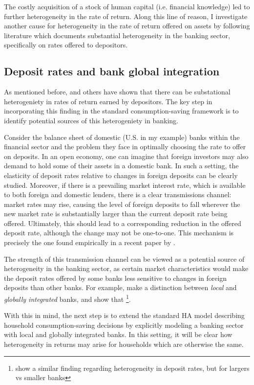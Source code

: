 \par The costly acquisition of a stock of human capital (i.e. financial knowledge) led to further heterogeneity in the rate of return. Along this line of reason, I investigate another cause for heterogeneity in the rate of return offered on assets by following literature which documents substantial heterogeneity in the banking sector, specifically on rates offered to depositors.

\subsection{Deposit rates and bank global integration}

\par As mentioned before, \cite{Deuflhard2018} and others have shown that there can be substational heterogeniety in rates of return earned by depositors. The key step in incorporating this finding in the standard consumption-saving framework is to identify potential sources of this heterogeniety in banking.

\par Consider the balance sheet of domestic (U.S. in my example) banks within the financial sector and the problem they face in optimally choosing the rate to offer on deposits. In an open economy, one can imagine that foreign investors may also demand to hold some of their assets in a domestic bank. In such a setting, the elasticity of deposit rates relative to changes in foreign deposits can be clearly studied. Moreover, if there is a prevailing market interest rate, which is available to both foreign and domestic lenders, there is a clear transmissions channel: market rates may rise, causing the level of foreign deposits to fall wherever the new market rate is substantially larger than the current deposit rate being offered. Ultimately, this should lead to a corresponding reduction in the offered deposit rate, although the change may not be one-to-one. This mechanism is precisely the one found empirically in a recent paper by \cite{Ahmed2025}.

\par The strength of this transmission channel can be viewed as a potential source of heterogeneity in the banking sector, as certain market characteristics would make the deposit rates offered by some banks less sensitive to changes in foreign deposits than other banks. For example, \cite{Sarkisyan2021} make a distinction between \textit{local} and \textit{globally integrated} banks, and show that  \footnote{ \cite{d'Avernas2024} show a similar finding regarding heterogeneity in deposit rates, but for largers vs smaller banks}.

\par With this in mind, the next step is to extend the standard HA model describing household consumption-saving decisions by explicitly modeling a banking sector with local and globally integrated banks. In this setting, it will be clear how heterogeneity in returns may arise for households which are otherwise the same.